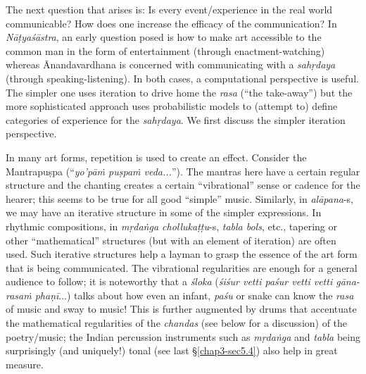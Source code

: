 The next question that arises is: Is every event/experience in the real world communicable? How does one increase the efficacy of the communication? In \textsl{Nāṭyaśāstra}, an early question posed is how to make art accessible to the common man in the form of entertainment (through enactment-watching) whereas Ānandavardhana is concerned with communicating with a \textsl{sahṛdaya} (through speaking-listening). In both cases, a computational perspective is useful. The simpler one uses iteration to drive home the \textsl{rasa} (“the take-away”) but the more sophisticated approach uses probabilistic models to (attempt to) define categories of experience for the \textsl{sahṛdaya}. We first discuss the simpler iteration perspective. 

In many art forms, repetition is used to create an effect. Consider the Mantrapuṣpa (“\textsl{yo’pāṁ puṣpaṁ veda...}”). The mantras here have a certain regular structure and the chanting creates a certain “vibrational” sense or cadence for the hearer; this seems to be true for all good “simple” music. Similarly, in \textsl{alāpana}-s, we may have an iterative structure in some of the simpler expressions. In rhythmic compositions, in \textsl{mṛdaṅga chollukaṭṭu}-s, \textsl{tabla bols}, etc., tapering or other “mathematical” structures (but with an element of iteration) are often used. Such iterative structures help a layman to grasp the essence of the art form that is being communicated. The vibrational regularities are enough for a general audience to follow; it is noteworthy that a \textsl{śloka} (\textsl{śiśur vetti paśur vetti vetti gāna-rasaṁ phaṇī}...) talks about how even an infant, \textsl{paśu} or snake can know the \textsl{rasa} of music and sway to music! This is further augmented by drums that accentuate the mathematical regularities of the \textsl{chandas} (see below for a discussion) of the poetry/music; the Indian percussion instruments such as \textsl{mṛdaṅga} and \textsl{tabla} being surprisingly (and uniquely!) tonal (see last \S\ref{chap3-sec5.4}) also help in great measure. 

